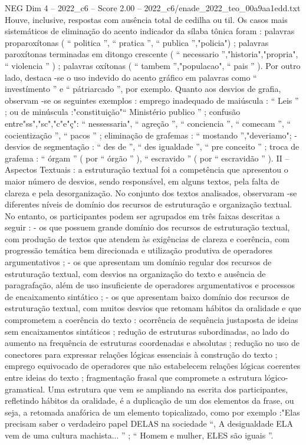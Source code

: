 \begin{textsample}{NEG Dim 4 – 2022\_c6 – Score 2.00 – 2022\_c6/enade\_2022\_teo\_00a9aa1edd.txt}
Houve, inclusive, respostas com ausência total de cedilha ou til.
Os casos mais sistemáticos de eliminação do acento indicador da sílaba tônica foram : palavras proparoxítonas ( “ politica ”, “ pratica ”, “ publica ”,"policia") ; palavras paroxítonas terminadas em ditongo crescente ( “ necessario ”,"historia","propria", “ violencia ” ) ; palavras oxítonas ( “ tambem ”,"populacao", “ pais ” ).
Por outro lado, destaca -se o uso indevido do acento gráfico em palavras como “ investímento ” e “ pátriarcado ”, por exemplo.
Quanto aos desvios de grafia, observam -se os seguintes exemplos : emprego inadequado de maiúscula : “ Leis ” ; ou de minúscula :"constituição"“ Ministério publico ” ; confusão entre"ss","sc","c"e"ç": “ nessessaria", “ agreção ”, “ conciencia ”, “ comecam ”, “ cocientização ”, “ pacos ” ; eliminação de grafemas : “ mostando ”,"deveriamo"; - desvios de segmentação : “ des de ”, “ des igualdade ”, “ pre conceito ” ; troca de grafema : “ órgam ” ( por “ órgão ” ), “ escravido ” ( por “ escravidão ” ).
II – Aspectos Textuais : a estruturação textual foi a competência que apresentou o maior número de desvios, sendo responsável, em alguns textos, pela falta de clareza e pela desorganização.
No conjunto dos textos analisados, observaram -se diferentes níveis de domínio dos recursos de estruturação e organização textual.
No entanto, os participantes podem ser agrupados em três faixas descritas a seguir : - os que possuem grande domínio dos recursos de estruturação textual, com produção de textos que atendem às exigências de clareza e coerência, com progressão temática bem direcionada e utilização produtiva de operadores argumentativos ; - os que apresentam um domínio regular dos recursos de estruturação textual, com desvios na organização do texto e ausência de paragrafação, além de uso insuficiente de operadores argumentativos e processos de encaixamento sintático ; - os que apresentam baixo domínio dos recursos de estruturação textual, com muitos desvios que retomam hábitos da oralidade e que comprometem a coerência do texto : ocorrência de sequência justaposta de ideias sem encaixamentos sintáticos ; redução de estruturas subordinadas, ao lado do aumento na frequência de estruturas coordenadas e absolutas ; redução no uso de conectores para expressar relações lógicas essenciais à construção do texto ; emprego equivocado de operadores que não estabelecem relações lógicas coerentes entre ideias do texto ; fragmentação frasal que compromete a estrutura lógico-gramatical.
Uma estrutura que vem se ampliando na escrita dos participantes, refletindo hábitos da oralidade, é a duplicação de um dos elementos da frase, ou seja, a retomada anafórica de um elemento topicalizado, como por exemplo :"Elas precisam saber o verdadeiro papel DELAS na sociedade “, A desigualdade ELA vem de uma cultura machista... ” ; “ Homem e mulher, ELES são iguais ”.

\end{textsample}
